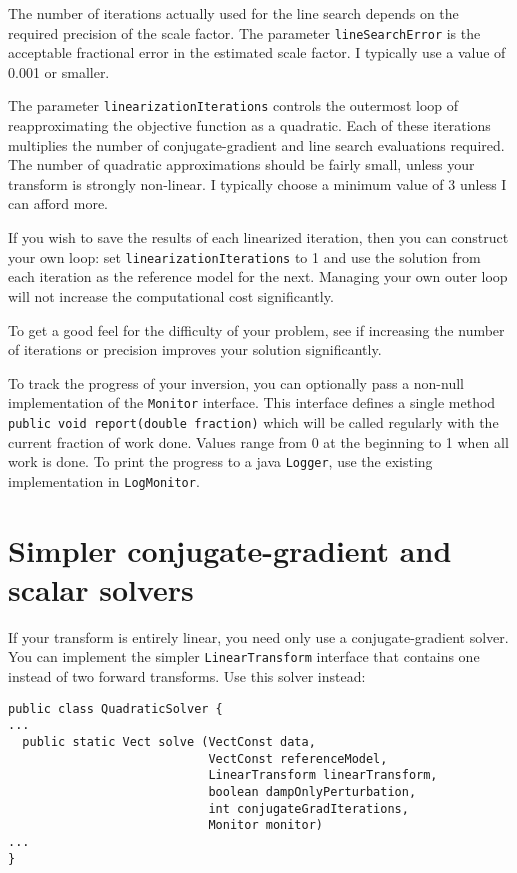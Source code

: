 \documentclass[12pt]{article}
\begin{document}
The number of iterations actually used for
the line search depends on the required
precision of the scale factor.  The parameter
\texttt{lineSearchError} is the acceptable
fractional error in the estimated scale
factor.  I typically use a value of 0.001 or
smaller.

The parameter
\texttt{linearizationIterations} controls the
outermost loop of reapproximating the
objective function as a quadratic.  Each of
these iterations multiplies the number of
conjugate-gradient and line search
evaluations required.  The number of
quadratic approximations should be fairly
small, unless your transform is strongly
non-linear.  I typically choose a minimum
value of 3 unless I can afford more.

If you wish to save the results of each
linearized iteration, then you can construct
your own loop: set
\texttt{linearization\-Iterations} to 1 and
use the solution from each iteration as the
reference model for the next.  Managing your
own outer loop will not increase the
computational cost significantly.

To get a good feel for the difficulty of your
problem, see if increasing the number of
iterations or precision improves your
solution significantly.

To track the progress of your inversion, you
can optionally pass a non-null implementation
of the \texttt{Monitor} interface.  This
interface defines a single method
\texttt{public void report(double fraction)}
which will be called regularly with the
current fraction of work done.  Values range
from 0 at the beginning to 1 when all work is
done.  To print the progress to a java
\texttt{Logger}, use the existing
implementation in \texttt{LogMonitor}.

\section {Simpler conjugate-gradient and
scalar solvers}

If your transform is entirely linear, you
need only use a conjugate-gradient solver.
You can implement the simpler
\texttt{LinearTransform} interface that
contains one instead of two forward
transforms.  Use this solver instead:

{\footnotesize \begin{verbatim} 
public class QuadraticSolver {
...
  public static Vect solve (VectConst data,
                            VectConst referenceModel,
                            LinearTransform linearTransform,
                            boolean dampOnlyPerturbation,
                            int conjugateGradIterations,
                            Monitor monitor) 
...
}
\end{verbatim}} 
\end{document}
